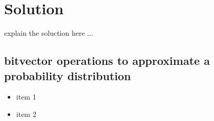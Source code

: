 \section{Solution}
\label{sec:solution}

explain the soluction here ...

\subsection{bitvector operations to approximate a probability distribution}

\begin{itemize}
	\item item 1
	
	\item item 2
\end{itemize}

